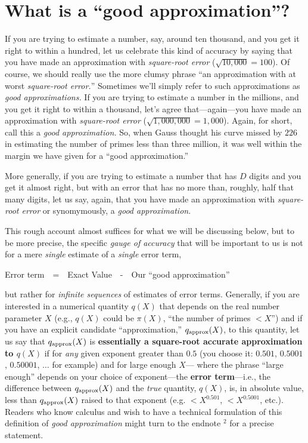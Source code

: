 \documentclass[11pt]{article}
\theoremstyle{plain}
\theoremstyle{definition}
\numberwithin{equation}{section}
\numberwithin{figure}{section}
\numberwithin{table}{section}
\begin{document}
\section{What is a ``good approximation''?}\label{sec:sqrterror}

If you are trying to estimate a number, say, around ten thousand, and
you get it right to within a hundred, let us celebrate this kind of
accuracy by saying that you have made an approximation with {\em
  square-root error} (${\sqrt{10,\!000}}=100$). Of course, we should
really use the more clumsy phrase ``an approximation with at worst
{\em square-root error.}''  Sometimes we'll simply refer to such
approximations as {\em good approximations.} If you are trying to
estimate a number in the millions, and you get it right to within a
thousand, let's agree that---again---you have made an approximation
with {\em square-root error} (${\sqrt{1,\!000,\!000}}=1,\!000$).
Again, for short, call this a {\em good approximation.} So, when Gauss
thought his curve missed by $226$ in estimating the number of primes
less than three million, it was well within the margin we have given
for a ``good approximation.''

More generally, if you are trying to estimate a number that has $D$
digits and you get it almost right, but with an error that has no more
than, roughly, half that many digits, let us say, again, that you have
made an approximation with {\em square-root error} or synomymously, a
{\em good approximation}.


This rough account almost suffices for what we will be discussing
below, but to be more precise, the specific {\em gauge of accuracy}
that will be important to us is not for a mere {\em single} estimate
of a {\em single} error term, \bigskip
 
 \centerline{Error term\ \  =\ \    Exact Value\ \   -\ \   Our ``good  approximation''}
  
 \bigskip
 
 \noindent but rather for {\em infinite sequences} of estimates of
 error terms. Generally, if you are interested in a numerical quantity
 $q(X)$ that depends on the real number parameter $X$ (e.g., $q(X)$
 could be $\pi(X)$, ``the number of primes $< X$'') and if you have an
 explicit candidate ``approximation,'' $q_{\rm approx}(X)$, to this
 quantity, let us say that $q_{\rm approx}(X)$ is {\bf essentially a
   square-root accurate approximation to $q(X)$} if for {\em any}
 given exponent greater than $0.5$ (you choose it: $0.501$, $0.5001$,
 $0.50001$, $\dots$ for example) and for large enough $X$--- where the
 phrase ``large enough'' depends on your choice of exponent---the {\bf
   error term}---i.e., the difference between $q_{\rm approx}(X)$ and
 the {\em true} quantity, $q(X)$, is, in absolute value, less than
 $q_{\rm approx}(X)$ raised to that exponent (e.g. $< X^{0.501}$, $<
 X^{0.5001}$, etc.). Readers who know calculus and wish to have a
 technical formulation of this definition of {\em good approximation}
 might turn to the endnote $^2$ for a precise statement.
\end{document}
